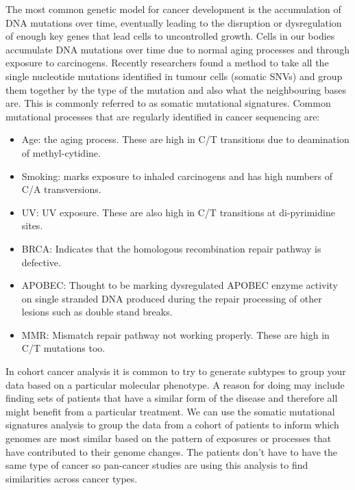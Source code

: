 The most common genetic model for cancer development is the accumulation of DNA mutations over time, eventually leading to the disruption or dysregulation of enough key genes that lead cells to uncontrolled growth.
Cells in our bodies accumulate DNA mutations over time due to normal aging processes and through exposure to carcinogens.
\vspace{4 mm}
Recently researchers found a method to take all the single nucleotide mutations identified in tumour cells (somatic SNVs) and group them together by the type of the mutation and also what the neighbouring bases are. This is commonly referred to as somatic mutational signatures.
\vspace{4 mm}
Common mutational processes that are regularly identified in cancer sequencing are:
\begin{itemize}
\item Age: the aging process. These are high in C/T transitions due to deamination of methyl-cytidine.
\item Smoking: marks exposure to inhaled carcinogens and has high numbers of C/A transversions.
\item UV: UV exposure. These are also high in C/T transitions at di-pyrimidine sites.
\item BRCA: Indicates that the homologous recombination repair pathway is defective.
\item APOBEC: Thought to be marking dysregulated APOBEC enzyme activity on single stranded DNA produced during the repair processing of other lesions such as double stand breaks.
\item MMR: Mismatch repair pathway not working properly. These are high in C/T mutations too.
\end{itemize}
\vspace{4 mm}
In cohort cancer analysis it is common to try to generate subtypes to group your data based on a particular molecular phenotype.
A reason for doing may include finding sets of patients that have a similar form of the disease and therefore all might benefit from a particular treatment.
We can use the somatic mutational signatures analysis to group the data from a cohort of patients to inform which genomes are most similar based on the pattern of exposures or processes that have contributed to their genome changes.
The patients don't have to have the same type of cancer so pan-cancer studies are using this analysis to find similarities across cancer types.



